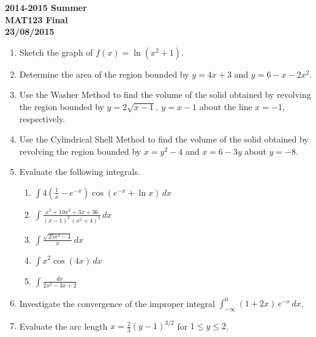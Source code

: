 \documentclass[a4paper, 12pt]{article}
\begin{document}
\newpage
{}
{}

\begin{center}
\textbf{2014-2015 Summer\\MAT123 Final\\23/08/2015}
\end{center}

\begin{enumerate}[leftmargin=*,label=\textbf{\arabic*.}]

\item Sketch the graph of $f(x)=\ln\left(x^2+1\right)$.

\item Determine the area of the region bounded by $y=4x+3$ and $y=6-x-2x^2$.

\item Use the Washer Method to find the volume of the solid obtained by revolving the region bounded by $y=2\sqrt{x-1},\: y=x-1$ about the line $x=-1$, respectively.

\item Use the Cylindrical Shell Method to find the volume of the solid obtained by revolving the region bounded by $x=y^2-4$ and $x=6-3y$ about $y=-8$.

\item Evaluate the following integrals.

\begin{enumerate}[leftmargin=*,label=\textbf{\alph*.}]

\item $\displaystyle\int4\left(\frac1x- e^{-x}\right)\cos\left( e^{-x}+\ln x\right)\,dx$

\item $\displaystyle\int\frac{x^3+10x^2+3x+36}{(x-1)^2\,\left(x^2+4\right)^2}\,dx$

\item $\displaystyle\int\frac{\sqrt{25x^2-4}}{x}\,dx$

\item $\displaystyle\int x^2\cos(4x)\,dx$

\item $\displaystyle\int\frac{dx}{2x^2-3x+2}$

\end{enumerate}

\item Investigate the convergence of the improper integral $\displaystyle\int_{-\infty}^0(1+2x)\, e^{-x}\,dx$.

\item Evaluate the arc length $\displaystyle x=\frac23(y-1)^{3/2}$ for $1\leq y\leq2$.

\end{enumerate}
\end{document}

